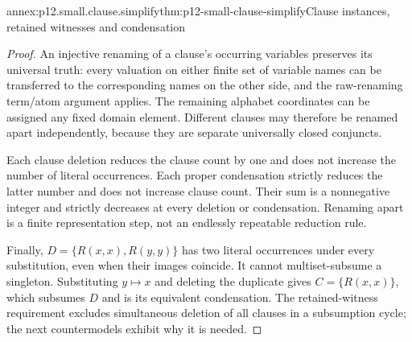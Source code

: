 \begin{annexitem}{annex:p12.small.clause.simplify}{thm:p12-small-clause-simplify}{Clause instances, retained witnesses and condensation}
\begin{proof}
An injective renaming of a clause's occurring variables preserves
its universal truth: every valuation on either finite set of
variable names can be transferred to the corresponding names on
the other side, and the raw-renaming term/atom argument applies.
The remaining alphabet coordinates can be assigned any fixed
domain element. Different clauses may therefore be renamed apart
independently, because they are separate universally closed conjuncts.

Each clause deletion reduces the clause count by one and does not
increase the number of literal occurrences. Each proper condensation
strictly reduces the latter number and does not increase clause
count. Their sum is a nonnegative integer and strictly decreases
at every deletion or condensation. Renaming apart is a finite
representation step, not an endlessly repeatable reduction rule.

Finally, \(D=\{R(x,x),R(y,y)\}\) has two literal occurrences
under every substitution, even when their images coincide. It
cannot multiset-subsume a singleton. Substituting \(y\mapsto x\)
and deleting the duplicate gives \(C=\{R(x,x)\}\), which
subsumes \(D\) and is its equivalent condensation.
The retained-witness requirement excludes simultaneous deletion
of all clauses in a subsumption cycle; the next countermodels
exhibit why it is needed.
\end{proof}
\end{annexitem}

